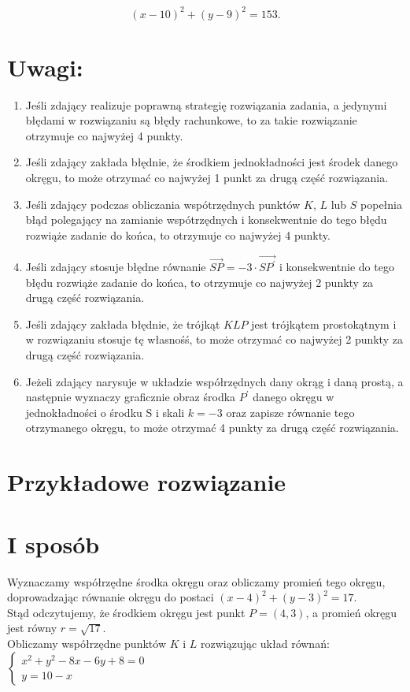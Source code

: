 \documentclass[10pt]{article}
\begin{document}
$$
(x-10)^{2}+(y-9)^{2}=153 .
$$

\section*{Uwagi:}
\begin{enumerate}
  \item Jeśli zdający realizuje poprawną strategię rozwiązania zadania, a jedynymi błędami w rozwiązaniu są błędy rachunkowe, to za takie rozwiązanie otrzymuje co najwyżej 4 punkty.
  \item Jeśli zdający zakłada błędnie, że środkiem jednokładności jest środek danego okręgu, to może otrzymać co najwyżej 1 punkt za drugą część rozwiązania.
  \item Jeśli zdający podczas obliczania wspótrzędnych punktów $K$, $L$ lub $S$ popełnia błąd polegający na zamianie wspótrzędnych i konsekwentnie do tego błędu rozwiąże zadanie do końca, to otrzymuje co najwyżej 4 punkty.
  \item Jeśli zdający stosuje błędne równanie $\overrightarrow{S P}=-3 \cdot \overrightarrow{S P^{\prime}}$ i konsekwentnie do tego błędu rozwiąże zadanie do końca, to otrzymuje co najwyżej 2 punkty za drugą część rozwiązania.
  \item Jeśli zdający zakłada błędnie, że trójkąt $K L P$ jest trójkątem prostokątnym i w rozwiązaniu stosuje tę własnośś, to może otrzymać co najwyżej 2 punkty za drugą część rozwiązania.
  \item Jeżeli zdający narysuje w układzie współrzędnych dany okrąg i daną prostą, a następnie wyznaczy graficznie obraz środka $P^{\prime}$ danego okręgu w jednokładności o środku S i skali $k=-3$ oraz zapisze równanie tego otrzymanego okręgu, to może otrzymać 4 punkty za drugą część rozwiązania.
\end{enumerate}

\section*{Przykładowe rozwiązanie}
\section*{I sposób}
Wyznaczamy współrzędne środka okręgu oraz obliczamy promień tego okręgu, doprowadzając równanie okręgu do postaci $(x-4)^{2}+(y-3)^{2}=17$.\\
Stąd odczytujemy, że środkiem okręgu jest punkt $P=(4,3)$, a promień okręgu jest równy $r=\sqrt{17}$.\\
Obliczamy współrzędne punktów $K$ i $L$ rozwiązując układ równań: $\left\{\begin{array}{l}x^{2}+y^{2}-8 x-6 y+8=0 \\ y=10-x\end{array}\right.$
\end{document}
